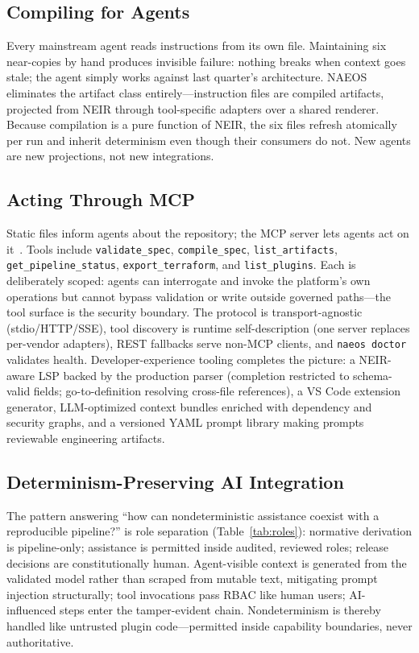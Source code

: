 \documentclass[sigconf,nonacm]{acmart}
\begin{document}
\subsection{Compiling for Agents}
Every mainstream agent reads instructions from its own file. Maintaining six near-copies by hand produces invisible failure: nothing breaks when context goes stale; the agent simply works against last quarter's architecture. NAEOS eliminates the artifact class entirely---instruction files are compiled artifacts, projected from NEIR through tool-specific adapters over a shared renderer. Because compilation is a pure function of NEIR, the six files refresh atomically per run and inherit determinism even though their consumers do not. New agents are new projections, not new integrations.

\subsection{Acting Through MCP}
Static files inform agents about the repository; the MCP server lets agents act on it~\cite{mcp2025}. Tools include \texttt{validate\_spec}, \texttt{compile\_spec}, \texttt{list\_artifacts}, \texttt{get\_pipeline\_status}, \texttt{export\_terraform}, and \texttt{list\_plugins}. Each is deliberately scoped: agents can interrogate and invoke the platform's own operations but cannot bypass validation or write outside governed paths---the tool surface is the security boundary. The protocol is transport-agnostic (stdio/HTTP/SSE), tool discovery is runtime self-description (one server replaces per-vendor adapters), REST fallbacks serve non-MCP clients, and \texttt{naeos doctor} validates health. Developer-experience tooling completes the picture: a NEIR-aware LSP backed by the production parser (completion restricted to schema-valid fields; go-to-definition resolving cross-file references), a VS Code extension generator, LLM-optimized context bundles enriched with dependency and security graphs, and a versioned YAML prompt library making prompts reviewable engineering artifacts.

\subsection{Determinism-Preserving AI Integration}
The pattern answering ``how can nondeterministic assistance coexist with a reproducible pipeline?'' is role separation (Table~\ref{tab:roles}): normative derivation is pipeline-only; assistance is permitted inside audited, reviewed roles; release decisions are constitutionally human. Agent-visible context is generated from the validated model rather than scraped from mutable text, mitigating prompt injection structurally; tool invocations pass RBAC like human users; AI-influenced steps enter the tamper-evident chain. Nondeterminism is thereby handled like untrusted plugin code---permitted inside capability boundaries, never authoritative.
\end{document}
